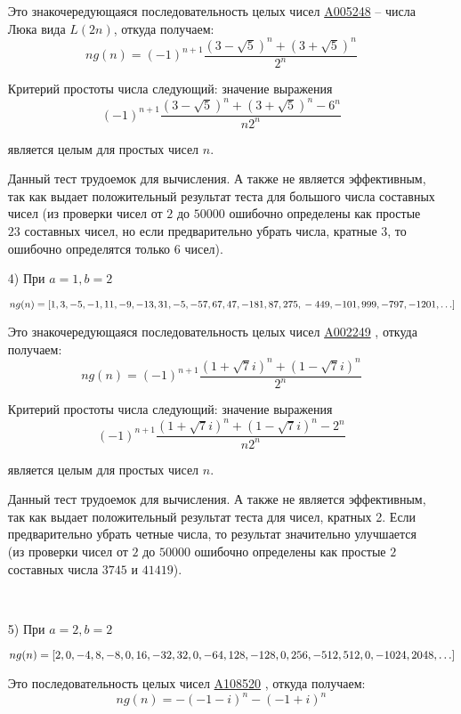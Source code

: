 \documentclass[
russian,
cp1251,
14pt,
simple
]{eskdtext}
\theoremstyle{definition}
\begin{document}
\begin{itemize}
Это знакочередующаяся последовательность целых чисел \href{http://oeis.org/A005248}{A005248} \cite{oeis} -- числа Люка вида $L(2n)$, откуда получаем:
$$
ng(n)=(-1)^{n+1}\frac{(3-\sqrt{5})^{n}+(3+\sqrt{5})^{n}}{2^{n}}
$$

Критерий простоты числа следующий: значение выражения
$$
(-1)^{n+1}\frac{(3-\sqrt{5})^{n}+(3+\sqrt{5})^{n}-6^{n}}{n 2^{n}}
$$

является целым для простых чисел $n$.

Данный тест трудоемок для вычисления. А также не является эффективным, так как выдает положительный результат теста для большого числа составных чисел (из проверки чисел от $2$ до $50000$ ошибочно определены как простые $23$ составных чисел, но если предварительно убрать числа, кратные $3$, то ошибочно определятся только $6$ чисел).

\item[4)] При $a=1, b=2$

\begin{math}
ng(n)=[1,3,-5,-1,11,-9,-13,31,-5,-57,67,47,-181,87,275,\\
-449,-101,999,-797,-1201,\ldots]
\end{math}

Это знакочередующаяся последовательность целых чисел \href{http://oeis.org/A002249}{A002249} \cite{oeis}, откуда получаем:
$$
ng(n)=(-1)^{n+1}\frac{(1+\sqrt{7} i)^{n}+(1-\sqrt{7} i)^{n}}{2^{n}}
$$

Критерий простоты числа следующий: значение выражения
$$
(-1)^{n+1}\frac{(1+\sqrt{7} i)^{n}+(1-\sqrt{7} i)^{n}-2^{n}}{n 2^{n}}
$$

является целым для простых чисел $n$.

Данный тест трудоемок для вычисления. А также не является эффективным, так как выдает положительный результат теста для чисел, кратных 2. Если предварительно убрать четные числа, то результат значительно улучшается (из проверки чисел от $2$ до $50000$ ошибочно определены как простые $2$ составных числа $3745$ и $41419$).

\ \\
\item[5)] При $a=2, b=2$

\begin{math}
ng(n)=[2,0,-4,8,-8,0,16,-32,32,0,-64,128,-128,0,256,-512,\\
512,0,-1024,2048,\ldots]
\end{math}

Это последовательность целых чисел \href{http://oeis.org/A108520}{A108520} \cite{oeis}, откуда получаем:
$$
ng(n)=-(-1-i)^{n}-(-1+i)^{n}
$$


\end{itemize}
\end{document}
